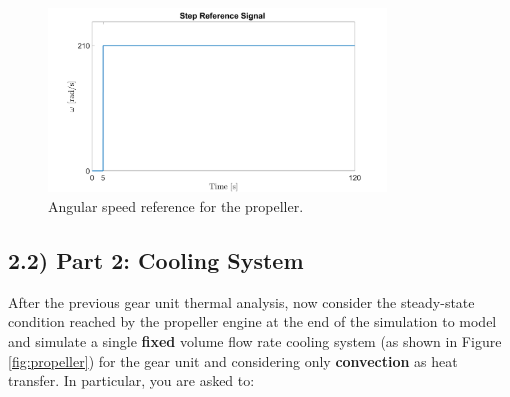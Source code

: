 \documentclass[11pt,a4paper,oneside]{article}
\begin{document}
    \begin{figure}[h!]
\centering
\includegraphics[width=0.8\textwidth]{ReferenceSignal.png}
\caption{\label{fig:refsignal} Angular speed reference for the propeller.}
\end{figure}



\subsection*{2.2) Part 2: Cooling System}
After the previous gear unit thermal analysis, now consider the steady-state condition reached by the propeller engine at the end of the simulation to model and simulate a single \textbf{fixed} volume flow rate cooling system (as shown in Figure \ref{fig:propeller}) for the gear unit and considering only \textbf{convection} as heat transfer. In particular, you are asked to:
\end{document}
